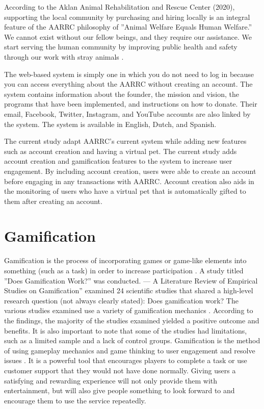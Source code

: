 According to the Aklan Animal Rehabilitation and Rescue Center (2020), supporting the local community by purchasing and hiring locally is an integral
feature of the AARRC philosophy of ”Animal Welfare Equals Human Welfare.”
We cannot exist without our fellow beings, and they require our assistance. We
start serving the human community by improving public health and safety through
our work with stray animals \cite{aarrc2020animal}.

The web-based system is simply one in which you do not need to log in because
you can access everything about the AARRC without creating an account. The system contains information about the founder, the mission and vision, the
programs that have been implemented, and instructions on how to donate. Their
email, Facebook, Twitter, Instagram, and YouTube accounts are also linked by
the system. The system is available in English, Dutch, and Spanish.

The current study adapt AARRC’s current system while adding new
features such as account creation and having a virtual pet. The current study
adds account creation and gamification features to the system to increase
user engagement. By including account creation, users  were able to create an
account before engaging in any transactions with AARRC. Account creation also
aids in the monitoring of users who have a virtual pet that is automatically gifted
to them after creating an account.

\section{Gamification}

Gamification is the process of incorporating games
or game-like elements into something (such as a task) in order to increase participation \cite{merriam00gami}. A study titled ”Does Gamification Work?” was conducted. — A
Literature Review of Empirical Studies on Gamification” \cite{hamari2014does}
examined 24 scientific studies that shared a high-level research question (not always
clearly stated): Does gamification work? The various studies examined use
a variety of gamification mechanics . According to the findings, the majority of
the studies examined yielded a positive outcome and benefits. It is also important
to note that some of the studies had limitations, such as a limited sample and a
lack of control groups.
Gamification is the method of using gameplay mechanics and game thinking
to user engagement and resolve issues \cite{zichermann2011gamification}. It is a powerful
tool that encourages players to complete a task or use customer support that they
would not have done normally. Giving users a satisfying and rewarding experience
will not only provide them with entertainment, but will also give people something
to look forward to and encourage them to use the service repeatedly.

